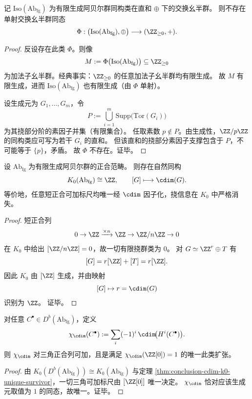 \begin{theorem}[保持直和结构的自然数编码不可能性]\label{thm:conclusion-cdim-no-faithful-additive-natural-code}
记 \(\mathrm{Iso}(\mathrm{Ab}_{\mathrm{fg}})\) 为有限生成阿贝尔群同构类在直和 \(\oplus\) 下的交换幺半群。
则不存在单射交换幺半群同态
\[
\Phi:\bigl(\mathrm{Iso}(\mathrm{Ab}_{\mathrm{fg}}),\oplus\bigr)\longrightarrow (\ZZ_{\ge 0},+).
\]
\end{theorem}
\begin{proof}
反设存在此类 \(\Phi\)。则像
\[
M:=\Phi\bigl(\mathrm{Iso}(\mathrm{Ab}_{\mathrm{fg}})\bigr)\subseteq \ZZ_{\ge 0}
\]
为加法子幺半群。经典事实：\(\ZZ_{\ge 0}\) 的任意加法子幺半群均有限生成。
故 \(M\) 有限生成，进而 \(\mathrm{Iso}(\mathrm{Ab}_{\mathrm{fg}})\) 也有限生成（由 \(\Phi\) 单射）。

设生成元为 \(G_1,\dots,G_m\)，令
\[
P:=\bigcup_{i=1}^{m}\mathrm{Supp}\bigl(\mathrm{Tor}(G_i)\bigr)
\]
为其挠部分阶的素因子并集（有限集合）。
任取素数 \(p\notin P\)。由生成性，\(\ZZ/p\ZZ\) 的同构类应可写为若干 \(G_i\) 的直和。
但该直和的挠部分素因子支撑包含于 \(P\)，不可能等于 \(\{p\}\)，矛盾。
故 \(\Phi\) 不存在。证毕。
\end{proof}

\begin{theorem}\label{thm:conclusion-cdim-k0-unique-survivor}
设 \(\mathrm{Ab}_{\mathrm{fg}}\) 为有限生成阿贝尔群的正合范畴。
则存在自然同构
\[
K_0(\mathrm{Ab}_{\mathrm{fg}})\cong \ZZ,
\qquad
[G]\longmapsto \cdim(G).
\]
等价地，任意短正合可加标尺均唯一经 \(\cdim\) 因子化，挠信息在 \(K_0\) 中严格消失。
\end{theorem}
\begin{proof}
短正合列
\[
0\to \ZZ\xrightarrow{\times n}\ZZ\to \ZZ/n\ZZ\to 0
\]
在 \(K_0\) 中给出
\(
[\ZZ/n\ZZ]=0
\)，故一切有限挠群类为 \(0\)。
对
\(
G\simeq \ZZ^r\oplus T
\)
有
\[
[G]=r[\ZZ]+[T]=r[\ZZ].
\]
因此 \(K_0\) 由 \([\ZZ]\) 生成，并由映射
\[
[G]\mapsto r=\cdim(G)
\]
识别为 \(\ZZ\)。
证毕。
\end{proof}

\begin{corollary}[圆维在有界导出范畴上的唯一归一化扩张]\label{cor:conclusion-cdim-derived-unique-extension}
对任意 \(C^\bullet\in D^b(\mathrm{Ab}_{\mathrm{fg}})\)，定义
\[
\chi_{\cdim}(C^\bullet):=\sum_i(-1)^i\,\cdim\!\bigl(H^i(C^\bullet)\bigr).
\]
则 \(\chi_{\cdim}\) 对三角正合列可加，且是满足
\(
\chi_{\cdim}(\ZZ[0])=1
\)
的唯一此类扩张。
\end{corollary}
\begin{proof}
由 \(K_0(D^b(\mathrm{Ab}_{\mathrm{fg}}))\cong K_0(\mathrm{Ab}_{\mathrm{fg}})\) 与定理 \ref{thm:conclusion-cdim-k0-unique-survivor}，一切三角可加标尺由 \([\ZZ[0]]\) 唯一决定。
\(\chi_{\cdim}\) 恰对应该生成元取值为 \(1\) 的同态，故唯一。证毕。
\end{proof}

